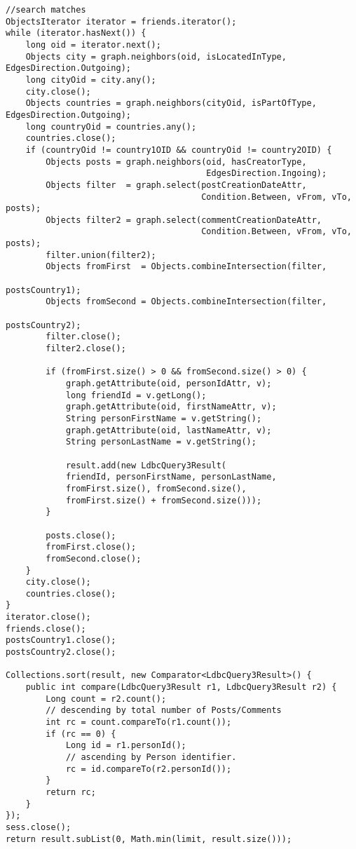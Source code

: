 {\begin{verbatim}
//search matches
ObjectsIterator iterator = friends.iterator();
while (iterator.hasNext()) {
    long oid = iterator.next();
    Objects city = graph.neighbors(oid, isLocatedInType, EdgesDirection.Outgoing);
    long cityOid = city.any();
    city.close();
    Objects countries = graph.neighbors(cityOid, isPartOfType, EdgesDirection.Outgoing);
    long countryOid = countries.any();
    countries.close();
    if (countryOid != country1OID && countryOid != country2OID) {
        Objects posts = graph.neighbors(oid, hasCreatorType, 
                                        EdgesDirection.Ingoing);
        Objects filter  = graph.select(postCreationDateAttr, 
                                       Condition.Between, vFrom, vTo, posts);
        Objects filter2 = graph.select(commentCreationDateAttr, 
                                       Condition.Between, vFrom, vTo, posts);
        filter.union(filter2);
        Objects fromFirst  = Objects.combineIntersection(filter, 
                                                         postsCountry1);
        Objects fromSecond = Objects.combineIntersection(filter, 
                                                         postsCountry2);
        filter.close();
        filter2.close();

        if (fromFirst.size() > 0 && fromSecond.size() > 0) {
            graph.getAttribute(oid, personIdAttr, v);
            long friendId = v.getLong();
            graph.getAttribute(oid, firstNameAttr, v);
            String personFirstName = v.getString();
            graph.getAttribute(oid, lastNameAttr, v);
            String personLastName = v.getString();

            result.add(new LdbcQuery3Result(
            friendId, personFirstName, personLastName,
            fromFirst.size(), fromSecond.size(),
            fromFirst.size() + fromSecond.size()));
        }

        posts.close();
        fromFirst.close();
        fromSecond.close();
    }
    city.close();
    countries.close();
}
iterator.close();
friends.close();
postsCountry1.close();
postsCountry2.close();

Collections.sort(result, new Comparator<LdbcQuery3Result>() {
    public int compare(LdbcQuery3Result r1, LdbcQuery3Result r2) {
        Long count = r2.count();
        // descending by total number of Posts/Comments
        int rc = count.compareTo(r1.count());         
        if (rc == 0) {
            Long id = r1.personId();
            // ascending by Person identifier.
            rc = id.compareTo(r2.personId());        
        }
        return rc;
    }
});
sess.close();
return result.subList(0, Math.min(limit, result.size()));

\end{verbatim}
}

